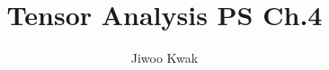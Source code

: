 \documentclass[A4]{homework}
\title{Tensor Analysis PS Ch.4}
\author{Jiwoo Kwak}
\begin{document}
\maketitle


%


\nocite{*} 
\printbibliography
\end{document}
